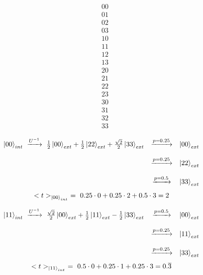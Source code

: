 \documentclass[12pt]{article}
\begin{document}
\begin{equation}
\quad
\begin{matrix}
00 \\ 01 \\ 02 \\ 03 \\ 10 \\ 11 \\ 12 \\ 13 \\ 20 \\ 21 \\ 22 \\ 23 \\ 30 \\ 31 \\ 32 \\ 33 
\end{matrix}
\end{equation}

\begin{equation}
\begin{matrix}
\ket{00}_{int} \ \xrightarrow{U^{-1}} \ \frac{1}{2}\ket{00}_{ext} + \frac{1}{2}\ket{22}_{ext} + \frac{\sqrt{2}}{2}\ket{33}_{ext} 
& \xrightarrow{p = 0.25} & \ket{00}_{ext} \\ \\
& \xrightarrow{p = 0.25} & \ket{22}_{ext} \\ \\
& \xrightarrow{p = 0.5} & \ket{33}_{ext}
\end{matrix}
\end{equation}
\begin{equation}
<t>_{\ket{00}_{int}} \ = \  0.25 \cdot 0 + 0.25 \cdot 2 + 0.5 \cdot 3 = 2
\end{equation}

\begin{equation}
\begin{matrix}
\ket{11}_{int} \ \xrightarrow{U^{-1}} \ \frac{\sqrt{2}}{2}\ket{00}_{ext} + \frac{1}{2}\ket{11}_{ext} - \frac{1}{2}\ket{33}_{ext} 
& \xrightarrow{p = 0.5} & \ket{00}_{ext} \\ \\
& \xrightarrow{p = 0.25} & \ket{11}_{ext} \\ \\
& \xrightarrow{p = 0.25} & \ket{33}_{ext}
\end{matrix}
\end{equation}
\begin{equation}
<t>_{\ket{11}_{int}} \ = \  0.5 \cdot 0 + 0.25 \cdot 1 + 0.25 \cdot 3 = 0.\overline{3}
\end{equation}
\end{document}
